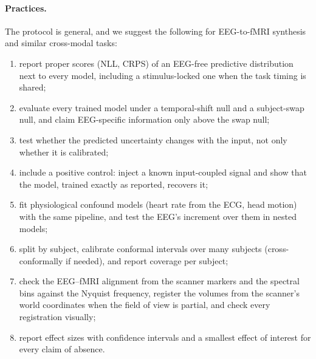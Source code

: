 \paragraph{Practices.} The protocol is general, and we suggest the following for EEG-to-fMRI synthesis and similar cross-modal tasks:
\begin{enumerate}
	\item report proper scores (NLL, CRPS) of an EEG-free predictive distribution next to every model, including a stimulus-locked one when the task timing is shared;
	\item evaluate every trained model under a temporal-shift null and a subject-swap null, and claim EEG-specific information only above the swap null;
	\item test whether the predicted uncertainty changes with the input, not only whether it is calibrated;
	\item include a positive control: inject a known input-coupled signal and show that the model, trained exactly as reported, recovers it;
	\item fit physiological confound models (heart rate from the ECG, head motion) with the same pipeline, and test the EEG's increment over them in nested models;
	\item split by subject, calibrate conformal intervals over many subjects (cross-conformally if needed), and report coverage per subject;
	\item check the EEG--fMRI alignment from the scanner markers and the spectral bins against the Nyquist frequency, register the volumes from the scanner's world coordinates when the field of view is partial, and check every registration visually;
	\item report effect sizes with confidence intervals and a smallest effect of interest for every claim of absence.
\end{enumerate}

